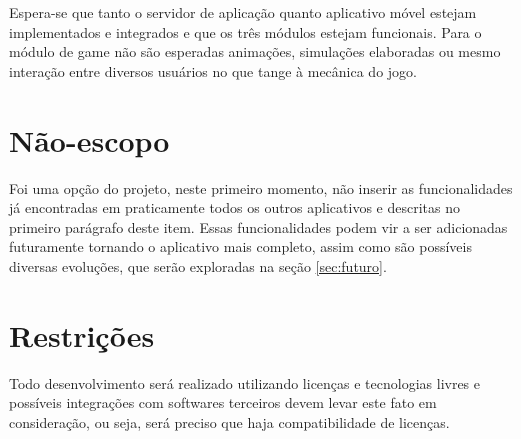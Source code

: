Espera-se que tanto o servidor de aplicação quanto aplicativo móvel estejam implementados e integrados e que os três módulos estejam funcionais. Para o módulo de game não são esperadas animações, simulações elaboradas ou mesmo interação entre diversos usuários no que tange à mecânica do jogo.

\section{Não-escopo}\label{sec:NãoEscopo}
Foi uma opção do projeto, neste primeiro momento, não inserir as funcionalidades já encontradas em praticamente todos os outros aplicativos e descritas no primeiro parágrafo deste item. Essas funcionalidades podem vir a ser adicionadas futuramente tornando o aplicativo mais completo, assim como são possíveis diversas evoluções, que serão exploradas na seção \ref{sec:futuro}.

\section{Restrições}\label{sec:restrições}
Todo desenvolvimento será realizado utilizando licenças e tecnologias livres e possíveis integrações com softwares terceiros devem levar este fato em consideração, ou seja, será preciso que haja compatibilidade de licenças.